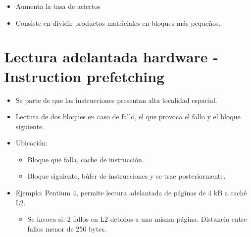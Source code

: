\documentclass[12pt, twoside, openright]{report} %
\begin{document}
\begin{itemize}
\begin{itemize}
        \begin{itemize}
        
        \item
          Aumenta la tasa de aciertos
        \item
          Consiste en dividir productos matriciales en bloques más
          pequeños.
        \end{itemize}
      \end{itemize}
    \end{itemize}
  \section{Lectura adelantada hardware - Instruction prefetching}

    \begin{itemize}
    
    \item
      Se parte de que las instrucciones presentan alta localidad
      espacial.
    \item
      Lectura de dos bloques en caso de fallo, el que provoca el fallo y
      el bloque siguiente.
    \item
      Ubicación:

      \begin{itemize}
      
      \item
        Bloque que falla, cache de instrucción.
      \item
        Bloque siguiente, búfer de instrucciones y se trae
        posteriormente.
      \end{itemize}
    \item
      Ejemplo: Pentium 4, permite lectura adelantada de páginas de 4 kB a
      caché L2.

      \begin{itemize}
      
      \item
        Se invoca si: 2 fallos en L2 debidos a una misma página.
        Distancia entre fallos menor de 256 bytes.
      \end{itemize}
    \end{itemize}
    \pagebreak
\end{document}
